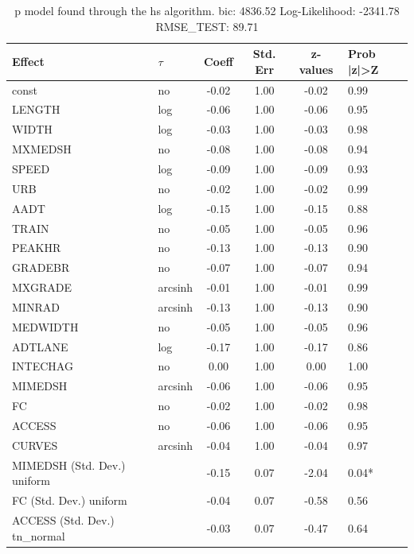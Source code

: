 \begin{table}
	\caption{p model found through the hs algorithm. bic: 4836.52 Log-Likelihood: -2341.78 RMSE_TEST: 89.71}
	\begin{center}
		\begin{tabular}{|l|l|c|c|c|l|}
			\hline
			Effect & $\tau$ & Coeff & Std. Err & z-values & Prob |z|>Z \\
			\hline
			const & no & -0.02 & 1.00 & -0.02 & 0.99 \\
			\hline
			LENGTH & log & -0.06 & 1.00 & -0.06 & 0.95 \\
			\hline
			WIDTH & log & -0.03 & 1.00 & -0.03 & 0.98 \\
			\hline
			MXMEDSH & no & -0.08 & 1.00 & -0.08 & 0.94 \\
			\hline
			SPEED & log & -0.09 & 1.00 & -0.09 & 0.93 \\
			\hline
			URB & no & -0.02 & 1.00 & -0.02 & 0.99 \\
			\hline
			AADT & log & -0.15 & 1.00 & -0.15 & 0.88 \\
			\hline
			TRAIN & no & -0.05 & 1.00 & -0.05 & 0.96 \\
			\hline
			PEAKHR & no & -0.13 & 1.00 & -0.13 & 0.90 \\
			\hline
			GRADEBR & no & -0.07 & 1.00 & -0.07 & 0.94 \\
			\hline
			MXGRADE & arcsinh & -0.01 & 1.00 & -0.01 & 0.99 \\
			\hline
			MINRAD & arcsinh & -0.13 & 1.00 & -0.13 & 0.90 \\
			\hline
			MEDWIDTH & no & -0.05 & 1.00 & -0.05 & 0.96 \\
			\hline
			ADTLANE & log & -0.17 & 1.00 & -0.17 & 0.86 \\
			\hline
			INTECHAG & no & 0.00 & 1.00 & 0.00 & 1.00 \\
			\hline
			MIMEDSH & arcsinh & -0.06 & 1.00 & -0.06 & 0.95 \\
			\hline
			FC & no & -0.02 & 1.00 & -0.02 & 0.98 \\
			\hline
			ACCESS & no & -0.06 & 1.00 & -0.06 & 0.95 \\
			\hline
			CURVES & arcsinh & -0.04 & 1.00 & -0.04 & 0.97 \\
			\hline
			MIMEDSH (Std. Dev.) uniform &  & -0.15 & 0.07 & -2.04 & 0.04* \\
			\hline
			FC (Std. Dev.) uniform &  & -0.04 & 0.07 & -0.58 & 0.56 \\
			\hline
			ACCESS (Std. Dev.) tn_normal &  & -0.03 & 0.07 & -0.47 & 0.64 \\

\end{tabular}
\end{center}
\end{table}

